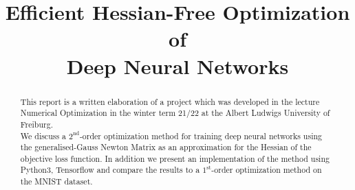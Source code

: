\documentclass[conference]{IEEEtran}
\begin{document}
	
	\title{Efficient Hessian-Free Optimization of \\Deep Neural Networks
	}
	
	\author{
		\and
		\and
	}
	
	\maketitle
	\thispagestyle{plain}
	\pagestyle{plain}
	
	\begin{abstract}
		\noindent
		This report is a written elaboration of a project which was developed in the lecture Numerical Optimization in the winter term 21/22 at the Albert Ludwigs University of Freiburg.\\
		We discuss a $2^{\text{nd}}$-order optimization method for training deep neural networks using the generalised-Gauss Newton Matrix as an approximation for the Hessian of the objective loss function. In addition we present an implementation of the method using Python3, Tensorflow and compare the results to a $1^{\text{st}}$-order optimization method on the MNIST dataset.
	\end{abstract}
	
\end{document}
